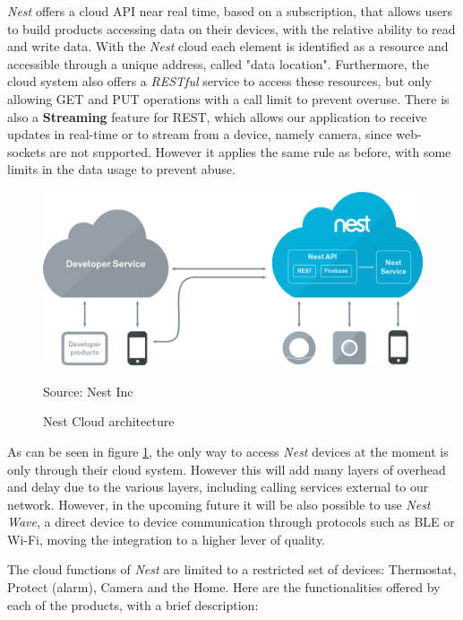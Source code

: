\textit{Nest} offers a cloud API near real time, based on a subscription, that allows
users to build products accessing data on their devices, with the relative ability
to read and write data. With the \textit{Nest} cloud each element is identified as a resource
and accessible through a unique address, called "data location".
Furthermore, the cloud system also offers a \textit{RESTful} service to access these resources,
but only allowing GET and PUT operations with a call limit to prevent overuse. There is also
a \textbf{Streaming} feature for REST, which allows our application to receive updates
in real-time or to stream from a device, namely camera, since web-sockets are not supported.
However it applies the same rule as before, with some limits in the data usage to prevent abuse.



\begin{figure}[h]
\caption{Nest Cloud architecture}
\label{fig:nestarch}
\centering
\includegraphics[scale=0.35]{nest-architecture.png}
\par{Source: Nest Inc}
\end{figure}

As can be seen in figure \ref{fig:nestarch}, the only way to access \textit{Nest} devices at the
moment is only through their cloud system. However this will add many layers of overhead
and delay due to the various layers, including calling services external to our network. However,
in the upcoming future it will be also possible to use \textit{Nest Wave}, a direct device
to device communication through protocols such as BLE or Wi-Fi, moving the integration to a higher
lever of quality.



The cloud functions of \textit{Nest} are limited to a restricted set of devices:
Thermostat, Protect (alarm), Camera and the Home.
Here are the functionalities offered by each of the products, with a brief description:
